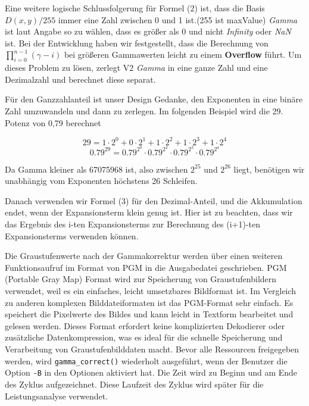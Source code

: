 \documentclass[course=erap]{aspdoc}
\begin{document}
\par
Eine weitere logische Schlussfolgerung für Formel (2) ist, dass die Basis \(D(x,y)/255\) immer eine Zahl zwischen 0 und 1 ist.(255 ist maxValue) \emph{Gamma} ist laut Angabe so zu wählen, dass es größer als 0 und nicht \emph{Infinity} oder \emph{NaN} ist. Bei der Entwicklung haben wir festgestellt, dass die Berechnung von \(\prod_{i=0}^{n-1} (\gamma-i)\) bei größeren Gammawerten leicht zu einem \textbf{Overflow} führt. Um dieses Problem zu lösen, zerlegt V2 \emph{Gamma} in eine ganze Zahl und eine Dezimalzahl und berechnet diese separat.

\par
Für den Ganzzahlanteil ist unser Design Gedanke, den Exponenten in eine binäre Zahl umzuwandeln und dann zu zerlegen. Im folgenden Beispiel wird die 29. Potenz von 0,79 berechnet

\[
29 = 1 \cdot 2^0 + 0 \cdot 2^1 + 1 \cdot 2^2 + 1 \cdot 2^3 + 1 \cdot 2^4
\]
\[
0.79^{29} = 0.79^{2^0} \cdot 0.79^{2^2} \cdot 0.79^{2^3} \cdot 0.79^{2^4}
\]

\par
Da Gamma kleiner als 67075968 ist, also zwischen $2^{25}$ und $2^{26}$ liegt, benötigen wir unabhängig vom Exponenten höchstens 26 Schleifen.

\par
Danach verwenden wir Formel (3) für den Dezimal-Anteil, und die Akkumulation endet, wenn der Expansionsterm klein genug ist. Hier ist zu beachten, dass wir das Ergebnis des i-ten Expansionsterms zur Berechnung des (i+1)-ten Expansionsterms verwenden können.

\par
Die Graustufenwerte nach der Gammakorrektur werden über einen weiteren Funktionsaufruf im Format von PGM in die Ausgabedatei geschrieben. PGM (Portable Gray Map) Format\cite{netpbm} wird zur Speicherung von Graustufenbildern verwendet, weil es ein einfaches, leicht umsetzbares Bildformat ist. Im Vergleich zu anderen komplexen Bilddateiformaten ist das PGM-Format sehr einfach. Es speichert die Pixelwerte des Bildes und kann leicht in Textform bearbeitet und gelesen werden. Dieses Format erfordert keine komplizierten Dekodierer oder zusätzliche Datenkompression, was es ideal für die schnelle Speicherung und Verarbeitung von Graustufenbilddaten macht. Bevor alle Ressourcen freigegeben werden, wird \texttt{gamma\_correct()} wiederholt ausgeführt, wenn der Benutzer die Option \texttt{-B} in den Optionen aktiviert hat. Die Zeit wird zu Beginn und am Ende des Zyklus aufgezeichnet. Diese Laufzeit des Zyklus wird später für die Leistungsanalyse verwendet.
\end{document}
